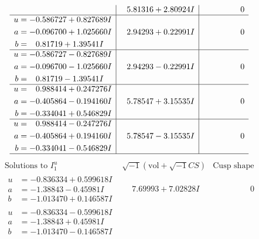 \documentclass[1p]{elsarticle_modified}
\theoremstyle{definition}
\newcommand{\I}{\sqrt{-1}}
\begin{document}
$$\begin{array}{c|c|c}
 & \phantom{-}5.81316 + 2.80924 I & \phantom{-0.000000 } 0 \\ \hline\begin{aligned}
u &= -0.586727 + 0.827689 I \\
a &= -0.096700 + 1.025660 I \\
b &= \phantom{-}0.81719 + 1.39541 I\end{aligned}
 & \phantom{-}2.94293 + 0.22991 I & \phantom{-0.000000 } 0 \\ \hline\begin{aligned}
u &= -0.586727 - 0.827689 I \\
a &= -0.096700 - 1.025660 I \\
b &= \phantom{-}0.81719 - 1.39541 I\end{aligned}
 & \phantom{-}2.94293 - 0.22991 I & \phantom{-0.000000 } 0 \\ \hline\begin{aligned}
u &= \phantom{-}0.988414 + 0.247276 I \\
a &= -0.405864 - 0.194160 I \\
b &= -0.334041 + 0.546829 I\end{aligned}
 & \phantom{-}5.78547 + 3.15535 I & \phantom{-0.000000 } 0 \\ \hline\begin{aligned}
u &= \phantom{-}0.988414 - 0.247276 I \\
a &= -0.405864 + 0.194160 I \\
b &= -0.334041 - 0.546829 I\end{aligned}
 & \phantom{-}5.78547 - 3.15535 I & \phantom{-0.000000 } 0\\
 \hline 
 \end{array}$$\newpage$$\begin{array}{c|c|c}  
\text{Solutions to }I^u_{1}& \I (\text{vol} + \sqrt{-1}CS) & \text{Cusp shape}\\
 \hline 
\begin{aligned}
u &= -0.836334 + 0.599618 I \\
a &= -1.38843 - 0.45981 I \\
b &= -1.013470 + 0.146587 I\end{aligned}
 & \phantom{-}7.69993 + 7.02828 I & \phantom{-0.000000 } 0 \\ \hline\begin{aligned}
u &= -0.836334 - 0.599618 I \\
a &= -1.38843 + 0.45981 I \\
b &= -1.013470 - 0.146587 I\end{aligned}

\end{array}$$
\end{document}
